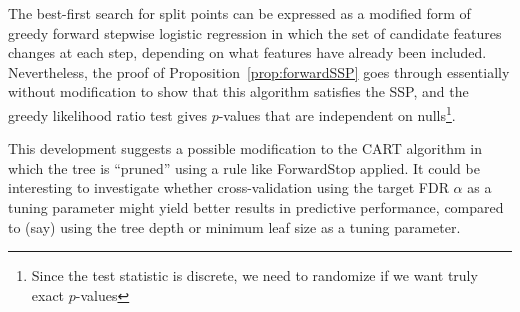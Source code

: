 \documentclass{article}
\begin{document}
The best-first search for split points can be expressed as a modified form of greedy forward stepwise logistic regression in which the set of candidate features changes at each step, depending on what features have already been included. Nevertheless, the proof of Proposition~\ref{prop:forwardSSP} goes through essentially without modification to show that this algorithm satisfies the SSP, and the greedy likelihood ratio test gives $p$-values that are independent on nulls\footnote{Since the test statistic is discrete, we need to randomize if we want truly exact $p$-values}.

This development suggests a possible modification to the CART algorithm in which the tree is ``pruned'' using a rule like ForwardStop applied. It could be interesting to investigate whether cross-validation using the target FDR $\alpha$ as a tuning parameter might yield better results in predictive performance, compared to (say) using the tree depth or minimum leaf size as a tuning parameter.
\end{document}
